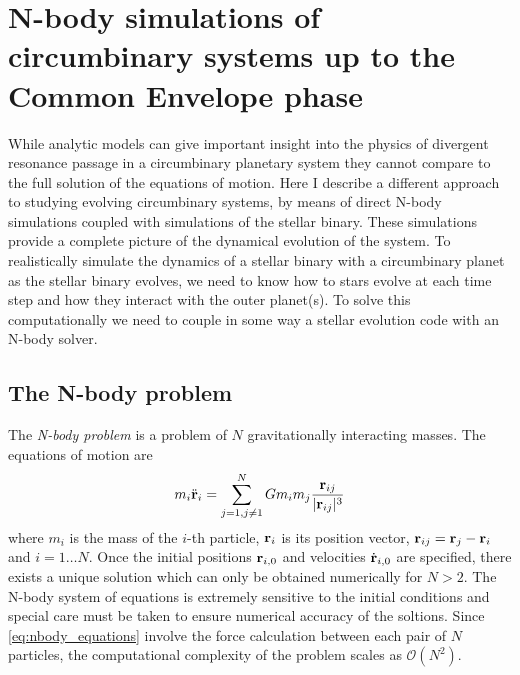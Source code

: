 \chapter{N-body simulations of circumbinary systems up to the Common Envelope phase}
\label{ch:NBODY_simulations}
While analytic models can give important insight into the physics 
of divergent resonance passage in a circumbinary planetary system
they cannot compare to the full solution of the equations of motion.
Here I describe a different approach to studying evolving
circumbinary systems, by means of direct
N-body simulations coupled with simulations of the stellar binary. 
These simulations provide a complete picture of the dynamical evolution
of the system. To realistically simulate the dynamics of a stellar binary
with a circumbinary planet as the stellar binary evolves, we need to know
how to stars evolve at each time step and how they interact with the outer
planet(s). To solve this computationally we need to couple in some way
a stellar evolution code with an N-body solver. 

\section{The N-body problem}
\label{sec:The N-body problem}
The \emph{N-body problem} is a problem of $N$ gravitationally interacting
masses. The equations of motion are
\begin{equation}
    m_i\ddot{\boldsymbol{\mathbf{r}}}_i=\sum_{j=1,j\neq 1}^NGm_im_j \frac{\boldsymbol{\mathbf{r}}_{ij}}
    {\lvert \boldsymbol{\mathbf{r}}_{ij}\rvert^3} 
    \label{eq:nbody_equations}
\end{equation}
where $m_i$ is the mass of the $i$-th particle, $\boldsymbol{\mathbf{r}}_i$ is its 
position vector, $\boldsymbol{\mathbf{r}}_{ij}=\boldsymbol{\mathbf{r}}_j-\boldsymbol{\mathbf{r}}_i$ and $i=1\dots N$.
Once the initial positions $\boldsymbol{\mathbf{r}}_{i,0}$ and velocities $\dot{\boldsymbol{\mathbf{r}}}_{i,0}$
are specified, there exists a unique solution which can only be obtained
numerically for $N>2$. The N-body system of equations is extremely sensitive
to the initial conditions and special care must be taken to ensure numerical
accuracy of the soltions. Since \cref{eq:nbody_equations} involve the force
calculation between each pair of $N$ particles, the computational complexity
of the problem scales as $\mathcal{O}(N^2)$.

